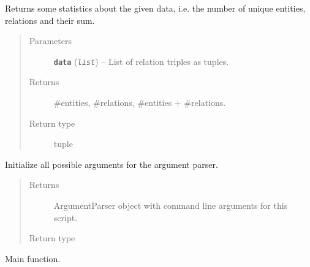 \documentclass[letterpaper,10pt,english]{sphinxmanual}
\begin{document}
\begin{fulllineitems}
\label{src.trans_e:src.trans_e.partition_data.get_stats}
Returns some statistics about the given data, i.e. the number of unique entities, relations and
their sum.
\begin{quote}\begin{description}
\item[{Parameters}] \leavevmode
\textbf{\texttt{data}} (\emph{\texttt{list}}) -- List of relation triples as tuples.

\item[{Returns}] \leavevmode
\#entities, \#relations, \#entities + \#relations.

\item[{Return type}] \leavevmode
tuple

\end{description}\end{quote}

\end{fulllineitems}


\begin{fulllineitems}
\label{src.trans_e:src.trans_e.partition_data.init_argparse}
Initialize all possible arguments for the argument parser.
\begin{quote}\begin{description}
\item[{Returns}] \leavevmode
ArgumentParser object with command line arguments for this script.

\item[{Return type}] \leavevmode
{}

\end{description}\end{quote}

\end{fulllineitems}


\begin{fulllineitems}
\label{src.trans_e:src.trans_e.partition_data.main}
Main function.

\end{fulllineitems}
\end{document}
